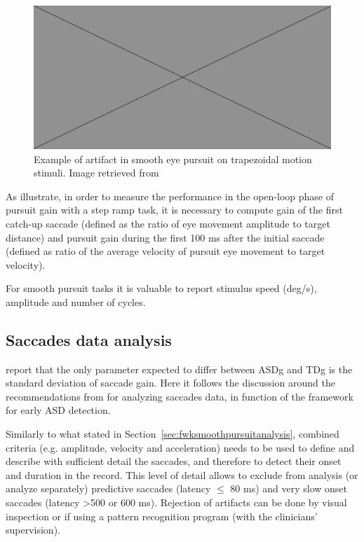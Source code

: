 \begin{figure}[h]
  \centering
  \includegraphics[width=.5\textwidth]{figures/placeholderImg.jpg}
  \caption[Blink artifact]{Example of artifact in smooth eye pursuit on trapezoidal motion stimuli. Image retrieved from \cite{randal1993smooth}}
  \label{fig:blinkartifacts}
\end{figure}

As \cite{takarae2004smoothpursuit} illustrate, in order to measure the performance in the open-loop phase of pursuit gain with a step ramp task, it is necessary to compute gain of the first catch-up saccade (defined as the ratio of eye movement amplitude to target distance) and pursuit gain during the first 100 ms after the initial saccade (defined as ratio of the average velocity of pursuit eye movement to target velocity).

For smooth pursuit tasks it is valuable to report stimulus speed (deg/s), amplitude and number of cycles.



\subsection{Saccades data analysis}
\label{sec:fwksaccadesanalysis}

\cite{johnson2016review} report that the only parameter expected to differ between ASDg and TDg is the standard deviation of saccade gain.
Here it follows the discussion around the recommendations from \cite{smyrnis2008guidelines} for analyzing saccades data, in function of the framework for early ASD detection.

Similarly to what stated in Section~\ref{sec:fwksmoothpursuitanalysis}, combined criteria (e.g. amplitude, velocity and acceleration) needs to be used to define and describe with sufficient detail the saccades, and therefore to detect their onset and duration in the record. This level of detail allows to exclude from analysis (or analyze separately) predictive saccades (latency \(\leq\) 80 ms) and very slow onset saccades (latency \textgreater 500 or 600 ms). Rejection of artifacts can be done by visual inspection or if using a pattern recognition program (with the clinicians’ supervision).

